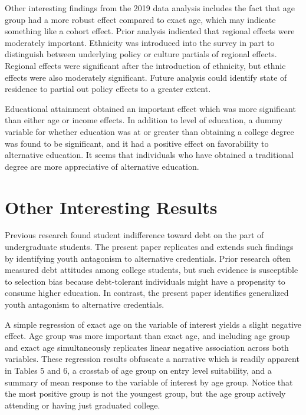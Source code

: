 \documentclass[AER]{/Users/zyl357/Documents/GitHub/research-dissertation-case-for-alt-ed/papers/alt-ed-survey/aea-latex-templates/AEA}
\begin{document}
Other interesting findings from the 2019 data analysis includes the fact
that age group had a more robust effect compared to exact age, which may
indicate something like a cohort effect. Prior analysis indicated that
regional effects were moderately important. Ethnicity was introduced into
the survey in part to distinguish between underlying policy or culture
partials of regional effects. Regional effects were significant after the
introduction of ethnicity, but ethnic effects were also moderately
significant. Future analysis could identify state of residence to partial
out policy effects to a greater extent.

Educational attainment obtained an important effect which was more
significant than either age or income effects. In addition to level of
education, a dummy variable for whether education was at or greater than
obtaining a college degree was found to be significant, and it had a
positive effect on favorability to alternative education. It seems that
individuals who have obtained a traditional degree are more appreciative
of alternative education.

\section{Other Interesting Results}

Previous research found student indifference toward debt on the part of
undergraduate students. The present paper replicates and extends such
findings by identifying youth antagonism to alternative credentials. Prior
research often measured debt attitudes among college students, but such
evidence is susceptible to selection bias because debt-tolerant
individuals might have a propensity to consume higher education. In
contrast, the present paper identifies generalized youth antagonism to
alternative credentials.

A simple regression of exact age on the variable of interest yields a
slight negative effect. Age group was more important than exact age, and
including age group and exact age simultaneously replicates linear
negative association across both variables. These regression results
obfuscate a narrative which is readily apparent in Tables 5 and 6, a
crosstab of age group on entry level suitability, and a summary of mean
response to the variable of interest by age group. Notice that the most
positive group is not the youngest group, but the age group actively
attending or having just graduated college.
\end{document}

